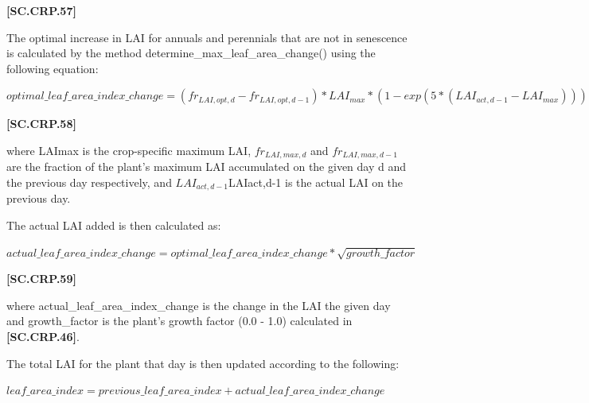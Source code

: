             {\raggedleft \textbf{[SC.CRP.57]}\par}
            \vspace{0.5cm}

The optimal increase in LAI for annuals and perennials that are not in senescence is calculated by the method determine\_max\_leaf\_area\_change()  using the following equation:
   \vspace{0.2cm}

    \begin{center}
        \(optimal\_leaf\_area\_index\_change =(fr_{LAI,opt,d}-fr_{LAI,opt,d-1}) * LAI_{max} * (1-exp(5 * (LAI_{act,d-1}-LAI_{max})))\) 
    \end{center}
        \vspace{0.5cm}
    
            {\raggedleft \textbf{[SC.CRP.58]}\par}
            \vspace{0.5cm}


where LAImax is the crop-specific maximum LAI, \(fr_{LAI,max,d}\) and \(fr_{LAI,max,d-1}\)are the fraction of the plant’s maximum LAI accumulated on the given day d and the previous day respectively, and  \(LAI_{act,d-1}\)LAIact,d-1 is the actual LAI on the previous day.

The actual LAI added is then calculated as: 
   \vspace{0.2cm}

    \begin{center}
        \(actual\_leaf\_area\_index\_change=optimal\_leaf\_area\_index\_change * \sqrt{growth\_factor}\) 
    \end{center}
        \vspace{0.5cm}
    
            {\raggedleft \textbf{[SC.CRP.59]}\par}
            \vspace{0.5cm}

where actual\_leaf\_area\_index\_change is the change in the LAI the given day and growth\_factor is the plant’s growth factor (0.0 - 1.0) calculated in \textbf{[SC.CRP.46]}.

The total LAI for the plant that day is then updated according to the following:
   \vspace{0.2cm}

    \begin{center}
        \(leaf\_area\_index=previous\_leaf\_area\_index+actual\_leaf\_area\_index\_change\) 
    \end{center}
        \vspace{0.5cm}


